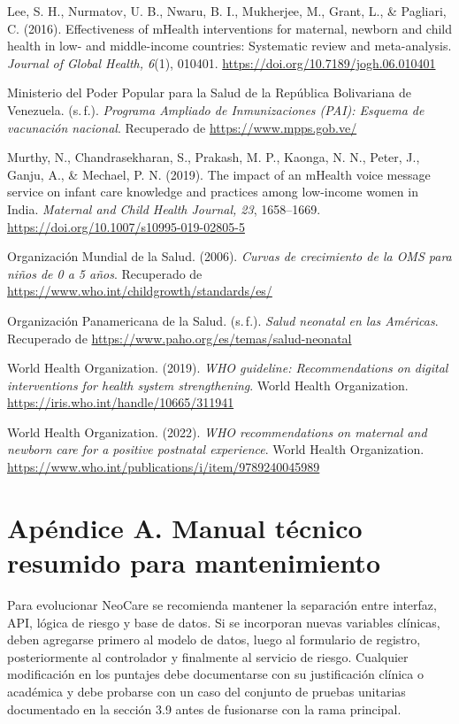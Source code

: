 \documentclass[12pt,letterpaper]{article}
\begin{document}
Lee, S. H., Nurmatov, U. B., Nwaru, B. I., Mukherjee, M., Grant, L., \& Pagliari, C. (2016). Effectiveness of mHealth interventions for maternal, newborn and child health in low- and middle-income countries: Systematic review and meta-analysis. \textit{Journal of Global Health, 6}(1), 010401. \url{https://doi.org/10.7189/jogh.06.010401}

Ministerio del Poder Popular para la Salud de la República Bolivariana de Venezuela. (s.\,f.). \textit{Programa Ampliado de Inmunizaciones (PAI): Esquema de vacunación nacional}. Recuperado de \url{https://www.mpps.gob.ve/}

Murthy, N., Chandrasekharan, S., Prakash, M. P., Kaonga, N. N., Peter, J., Ganju, A., \& Mechael, P. N. (2019). The impact of an mHealth voice message service on infant care knowledge and practices among low-income women in India. \textit{Maternal and Child Health Journal, 23}, 1658--1669. \url{https://doi.org/10.1007/s10995-019-02805-5}

Organización Mundial de la Salud. (2006). \textit{Curvas de crecimiento de la OMS para niños de 0 a 5 años}. Recuperado de \url{https://www.who.int/childgrowth/standards/es/}

Organización Panamericana de la Salud. (s.\,f.). \textit{Salud neonatal en las Américas}. Recuperado de \url{https://www.paho.org/es/temas/salud-neonatal}

World Health Organization. (2019). \textit{WHO guideline: Recommendations on digital interventions for health system strengthening}. World Health Organization. \url{https://iris.who.int/handle/10665/311941}

World Health Organization. (2022). \textit{WHO recommendations on maternal and newborn care for a positive postnatal experience}. World Health Organization. \url{https://www.who.int/publications/i/item/9789240045989}

\newpage
\appendix
\section{Apéndice A. Manual técnico resumido para mantenimiento}

Para evolucionar NeoCare se recomienda mantener la separación entre interfaz, API, lógica de riesgo y base de datos. Si se incorporan nuevas variables clínicas, deben agregarse primero al modelo de datos, luego al formulario de registro, posteriormente al controlador y finalmente al servicio de riesgo. Cualquier modificación en los puntajes debe documentarse con su justificación clínica o académica y debe probarse con un caso del conjunto de pruebas unitarias documentado en la sección 3.9 antes de fusionarse con la rama principal.
\end{document}
